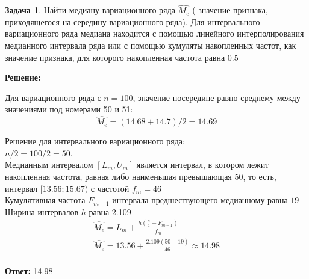 \documentclass[a4paper,11pt]{article}
\theoremstyle{definition}
\newtheorem{problem}{Задача}\setlength{\parindent}{0pt}
\newenvironment{solution}
{\begin{shaded}\textbf{Решение:}\par\setlength{\parindent}{0pt}}
{\end{shaded}}
\newenvironment{answer}
{\par\noindent\textbf{Ответ:} }
{\par}
\begin{document}
\vspace{8pt}
\begin{problem}
    Найти медиану вариационного ряда \(\hat{M_e}\) ( значение признака, приходящегося на
    середину вариационного ряда). Для интервального вариационного ряда медиана
    находится с помощью линейного интерполирования медианного интервала ряда
    или с помощью кумуляты накопленных частот, как значение признака, для
    которого накопленная частота равна \(0.5\)
    
        \begin{solution}
            Для вариационного ряда с \( n = 100 \), значение посередине равно среднему между значениями 
            под номерами 50 и 51:
            \[ \hat{M_e} = (14.68 + 14.7) / 2 = 14.69\]

            Решение для интервального вариационного ряда:\\
            \(n/2 = 100/2 = 50.\)\\
            Медианным интервалом \([L_m, U_m]\) является интервал, в котором лежит накопленная частота,
            равная либо наименьшая превышающая 50, то есть, интервал \([13.56; 15.67)\)
            с частотой \(f_m = 46\)\\
            Кумулятивная частота \(F_{m-1}\) интервала предшествующего медианному равна \(19\)
            Ширина интервалов \(h\) равна 2.109 \\


            \begin{gather*}
                \hat{M_e} = L_m + \frac{h(\frac{n}{2} - F_{m-1})}{f_m}\\
                \hat{M_e} = 13.56 + \frac{2.109(50 - 19)}{46} \approx 14.98\\
            \end{gather*}
            
        \end{solution}
    
        \begin{answer}
            14.98
        \end{answer}
    
    \end{problem}
\end{document}
